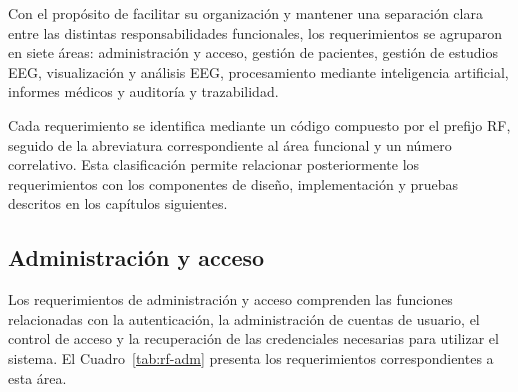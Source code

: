 Con el propósito de facilitar su organización y mantener una separación
clara entre las distintas responsabilidades funcionales, los requerimientos
se agruparon en siete áreas: administración y acceso, gestión de pacientes,
gestión de estudios EEG, visualización y análisis EEG, procesamiento mediante
inteligencia artificial, informes médicos y auditoría y trazabilidad.

Cada requerimiento se identifica mediante un código compuesto por el prefijo
RF, seguido de la abreviatura correspondiente al área funcional y un número
correlativo. Esta clasificación permite relacionar posteriormente los
requerimientos con los componentes de diseño, implementación y pruebas
descritos en los capítulos siguientes.

\subsection{Administración y acceso}
\label{subsec:rf-administracion}

Los requerimientos de administración y acceso comprenden las funciones
relacionadas con la autenticación, la administración de cuentas de usuario,
el control de acceso y la recuperación de las credenciales necesarias para
utilizar el sistema. El Cuadro~\ref{tab:rf-adm} presenta los requerimientos
correspondientes a esta área.

